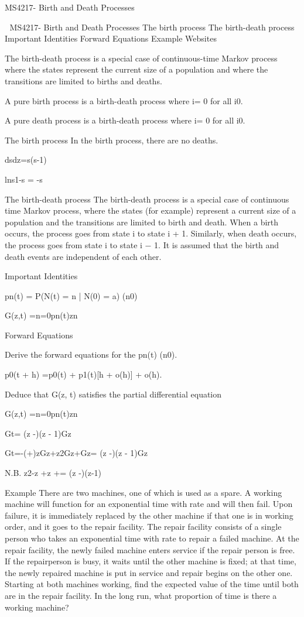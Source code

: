 MS4217-  Birth and Death Processes


MS4217-  Birth and Death Processes
The birth process
The birth-death process
Important Identities
Forward Equations
Example
Websites


The birth-death process is a special case of continuous-time Markov process where the states represent the current size of a population and where the transitions are limited to births  and deaths.

A pure birth process is a birth-death process where i= 0 for all i0.

A pure death process is a birth-death process where i= 0 for all i0.

The birth process
In the birth process, there are no deaths.

dsdz=s(s-1)

lns1-s = -s




The birth-death process
The birth-death process is a special case of continuous time Markov process, where the states (for example) represent a current size of a population and the transitions are limited to birth and death. When a birth occurs, the process goes from state i to state i + 1. Similarly, when death occurs, the process goes from state i to state i − 1. It is assumed that the birth and death events are independent of each other.

Important Identities


pn(t) = P(N(t) = n | N(0) = a)					(n0)

G(z,t) =n=0pn(t)zn


Forward Equations

Derive the forward equations for the pn(t) (n0).

p0(t + h) =p0(t) + p1(t)[h + o(h)] + o(h).


Deduce that G(z, t) satisfies the partial differential equation

G(z,t) =n=0pn(t)zn



Gt= (z -)(z - 1)Gz


Gt=-(+)zGz+z2Gz+Gz= (z -)(z - 1)Gz


N.B. z2-z +z += (z -)(z-1)

Example
There are two machines, one of which is used as a spare. A working machine will function for an exponential time with rate  and will then fail. Upon failure, it is immediately replaced by the other machine if that one is in working order, and it goes to the repair facility. The repair facility consists of a single person who takes an exponential time with rate  to repair a failed machine. At the repair facility, the newly failed machine enters service if the repair person is free. If the repairperson is busy, it waits until the other machine is fixed; at that time, the newly repaired machine is put in service and repair begins on the other one. Starting at both machines working, find the expected value of the time until both are in the repair facility. In the long run, what proportion of time is there a working machine?


